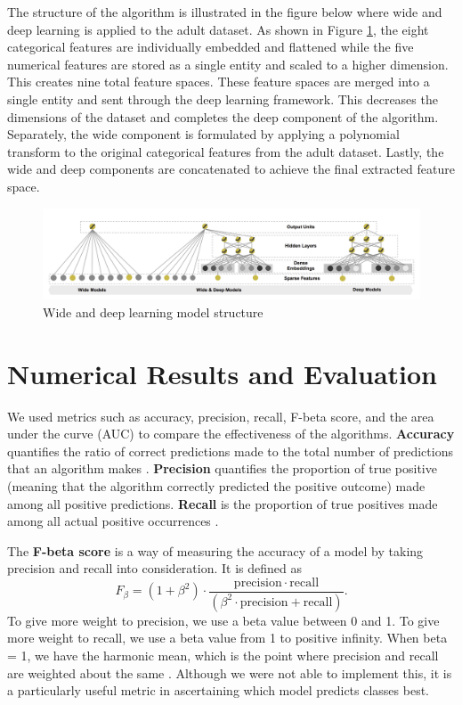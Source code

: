\documentclass[12pt,letterpaper]{article}
\theoremstyle{plain}
\theoremstyle{definition}
\begin{document}
The structure of the algorithm is illustrated in the figure below where wide and deep learning is applied to the adult dataset. As shown in Figure \ref{fig:widedeep}, the eight categorical features are individually embedded and flattened while the five numerical features are stored as a single entity and scaled to a higher dimension. This creates nine total feature spaces. These feature spaces are merged into a single entity and sent through the deep learning framework. This decreases the dimensions of the dataset and completes the deep component of the algorithm. Separately, the wide component is formulated by applying a polynomial transform to the original categorical features from the adult dataset. Lastly, the wide and deep components are concatenated to achieve the final extracted feature space.
\begin{figure}[H]
    \centering
    \includegraphics[scale=0.4, center]{wideanddeep.png}
    \caption{Wide and deep learning model structure}
    \label{fig:widedeep}
\end{figure}

\section{Numerical Results and Evaluation}

\hspace{\parindent}We used metrics such as accuracy, precision, recall, F-beta score, and the area under the curve (AUC) to compare the effectiveness of the algorithms. \textbf{Accuracy} quantifies the ratio of correct predictions made to the total number of predictions that an algorithm makes \cite{classificationaccuracy}. \textbf{Precision} quantifies the proportion of true positive (meaning that the algorithm correctly predicted the positive outcome) made among all positive predictions. \textbf{Recall} is the proportion of true positives made among all actual positive occurrences \cite{classificationprecisionrecall}. 

\hspace{\parindent}The \textbf{F-beta score} is a way of measuring the accuracy of a model by taking precision and recall into consideration. It is defined as 
    \begin{equation*}
        F_\beta = (1+\beta^2)\cdot\frac{\mathrm{precision\cdot    \mathrm{recall}}}{(\beta^2\cdot\mathrm{precision}+\mathrm{recall})}.
    \end{equation*} 
To give more weight to precision, we use a beta value between 0 and 1. To give more weight to recall, we use a beta value from 1 to positive infinity. When beta = 1, we have the harmonic mean, which is the point where precision and recall are weighted about the same \cite{fbeta}. Although we were not able to implement this, it is a particularly useful metric in ascertaining which model predicts classes best.
\end{document}
